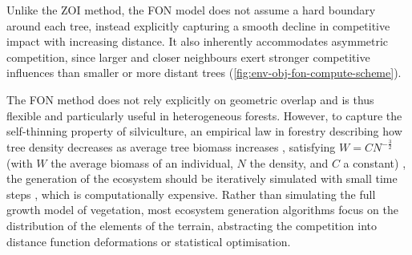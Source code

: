 Unlike the ZOI method, the FON model does not assume a hard boundary around each tree, instead explicitly capturing a smooth decline in competitive impact with increasing distance. It also inherently accommodates asymmetric competition, since larger and closer neighbours exert stronger competitive influences than smaller or more distant trees (\cref{fig:env-obj-fon-compute-scheme}).

The FON method does not rely explicitly on geometric overlap and is thus flexible and particularly useful in heterogeneous forests. However, to capture the self-thinning property of silviculture, an empirical law in forestry describing how tree density decreases as average tree biomass increases \cite{Makowski2019}, satisfying $W = C N^{-\frac{3}{2}}$ (with $W$ the average biomass of an individual, $N$ the density, and $C$ a constant) \cite{Westoby1984}, the generation of the ecosystem should be iteratively simulated with small time steps \cite{Alsweis2005}, which is computationally expensive. Rather than simulating the full growth model of vegetation, most ecosystem generation algorithms focus on the distribution of the elements of the terrain, abstracting the competition into distance function deformations or statistical optimisation.


